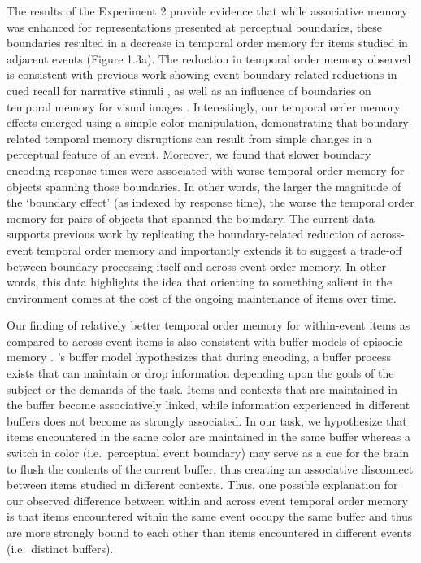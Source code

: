 The results of the Experiment 2 provide evidence that while associative
memory was enhanced for representations presented at perceptual
boundaries, these boundaries resulted in a decrease in temporal order
memory for items studied in adjacent events (Figure 1.3a). The reduction
in temporal order memory observed is consistent with previous work
showing event boundary-related reductions in cued recall for narrative
stimuli \autocite{ezzyat_what_2011}, as well as an influence of
boundaries on temporal memory for visual images
\autocites{dubrow_influence_2013}{ezzyat_similarity_2014}.
Interestingly, our temporal order memory effects emerged using a simple
color manipulation, demonstrating that boundary-related temporal memory
disruptions can result from simple changes in a perceptual feature of an
event. Moreover, we found that slower boundary encoding response times
were associated with worse temporal order memory for objects spanning
those boundaries. In other words, the larger the magnitude of the
`boundary effect' (as indexed by response time), the worse the temporal
order memory for pairs of objects that spanned the boundary. The current
data supports previous work by replicating the boundary-related
reduction of across-event temporal order memory and importantly extends
it to suggest a trade-off between boundary processing itself and
across-event order memory. In other words, this data highlights the idea
that orienting to something salient in the environment comes at the cost
of the ongoing maintenance of items over time.

Our finding of relatively better temporal order memory for within-event
items as compared to across-event items is also consistent with buffer
models of episodic memory
\autocites{atkinson_human_1968}{lehman_global_2009}{lehman_buffer_2013}{raaijmakers_search_1981}.
\textcite{lehman_buffer_2013} 's buffer model hypothesizes that during
encoding, a buffer process exists that can maintain or drop information
depending upon the goals of the subject or the demands of the task.
Items and contexts that are maintained in the buffer become
associatively linked, while information experienced in different buffers
does not become as strongly associated. In our task, we hypothesize that
items encountered in the same color are maintained in the same buffer
whereas a switch in color (i.e.~perceptual event boundary) may serve as
a cue for the brain to flush the contents of the current buffer, thus
creating an associative disconnect between items studied in different
contexts. Thus, one possible explanation for our observed difference
between within and across event temporal order memory is that items
encountered within the same event occupy the same buffer and thus are
more strongly bound to each other than items encountered in different
events (i.e.~distinct buffers).

